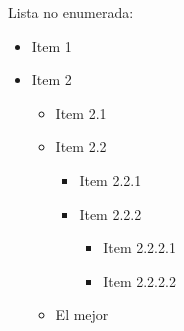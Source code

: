 \documentclass[11pt]{article}   %
\begin{document}
    Lista no enumerada:
    \begin{itemize}
        \item Item 1
        \item Item 2
        \begin{itemize}
            \item Item 2.1
            \item Item 2.2
            \begin{itemize}
                \item Item 2.2.1
                \item Item 2.2.2
                \begin{itemize}
                    \item Item 2.2.2.1
                    \item Item 2.2.2.2
                \end{itemize}
            \end{itemize}
            \item El mejor
        \end{itemize}
    \end{itemize}
\end{document}
